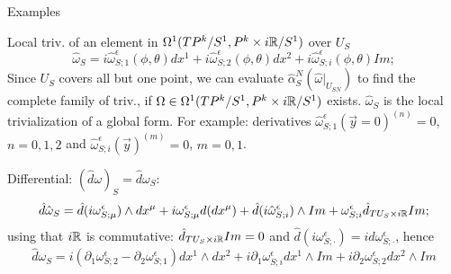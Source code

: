 \begin{frame}{Examples}

Local triv. of an element in $\Omega^1(TP^k/S^1, P^k \times i\mathbb{R}/S^1)$ over $U_S$
\begin{equation}
    \hat \omega_S = i\hat \omega^\epsilon_{S; 1}(\phi, \theta) dx^1 + i\hat \omega^\epsilon_{S; 2}(\phi, \theta) dx^2 + i\hat \omega^\epsilon_{S; i}(\phi, \theta) Im;
\end{equation}
Since $U_S$ covers all but one point, we can evaluate $\hat \alpha^N_S(\hat \omega|_{U_{SN}})$ to find the complete family of triv., if $\Omega \in \Omega^1(TP^k/S^1, P^k \times i\mathbb{R}/S^1)$ exists.  $\hat \omega_S$ is the local trivialization of a global form. For example: derivatives $\hat \omega_{S; 1}^\epsilon(\vec y = 0)^{(n)}=0$, $n = 0,1,2$ and $\hat \omega_{S; i}^\epsilon(\vec y)^{(m)} = 0$, $m= 0,1$.

Differential: $(\hat d \omega)_S = \hat d \omega_S$:
\begin{equation*}
    \hat d \hat \omega_S = \hat d (i\omega^\epsilon_{S;\mu}) \wedge dx^\mu + i  \omega^\epsilon_{S;\mu} d(dx^\mu) + \hat d(i \hat \omega^\epsilon_{S;i}) \wedge Im + \omega^\epsilon_{S;i} \hat d_{TU_S \times i\RR} Im;
\end{equation*}
using that $i\mathbb{R}$ is commutative: $\hat d_{TU_S \times i\mathbb{R}} Im = 0$ and $\hat d (i \omega^\epsilon_{S;\cdot}) = i d\omega^\epsilon_{S;\cdot}$, hence
\begin{equation}
    \hat d \omega_S = i(\partial_1 \omega^\epsilon_{S;2} - \partial_2 \omega^\epsilon_{S;1}) dx^1 \wedge dx^2 + i \partial_1 \omega^\epsilon_{S;i} dx^1 \wedge Im + i \partial_2 \omega^\epsilon_{S;2} dx^2 \wedge Im
\end{equation}


\end{frame}